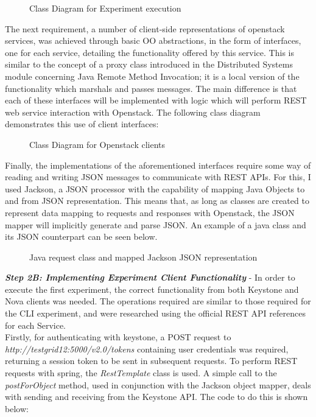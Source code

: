 \begin{figure}[H]
\centering
{}
\caption{Class Diagram for Experiment execution} 
\end{figure}

The next requirement, a number of client-side representations of openstack services, was achieved through basic OO abstractions, in the form of interfaces, one for each service, detailing the functionality offered by this service. This is similar to the concept of a proxy class introduced in the Distributed Systems module concerning Java Remote Method Invocation; it is a local version of the functionality which marshals and passes messages. The main difference is that each of these interfaces will be implemented with logic which will perform REST web service interaction with Openstack. The following class diagram demonstrates this use of client interfaces: \\

\begin{figure}[H]
\centering
{}
\caption{Class Diagram for Openstack clients} 
\end{figure}


Finally, the implementations of the aforementioned interfaces require some way of reading and writing JSON messages to communicate with REST APIs. For this, I used Jackson, a JSON processor with the capability of mapping Java Objects to and from JSON representation. This means that, as long as classes are created to represent data mapping to requests and responses with Openstack, the JSON mapper will implicitly generate and parse JSON. An example of a java class and its JSON counterpart can be seen below.

\begin{figure}[H]
\centering
{}
\caption{Java request class and mapped Jackson JSON representation} 
\end{figure}

\textbf{\textit{Step 2B: Implementing Experiment Client Functionality}} - In order to execute the first experiment, the correct functionality from both Keystone and Nova clients was needed. The operations required are similar to those required for the CLI experiment, and were researched using the official REST API references for each Service. \\
Firstly, for authenticating with keystone, a POST request to \textit{http://testgrid12:5000/v2.0/tokens} containing user credentials was required, returning a session token to be sent in subsequent requests. To perform REST requests with spring, the \textit{RestTemplate} class is used. A simple call to the \textit{postForObject} method, used in conjunction with the Jackson object mapper, deals with sending and receiving from the Keystone API. The code to do this is shown below:

